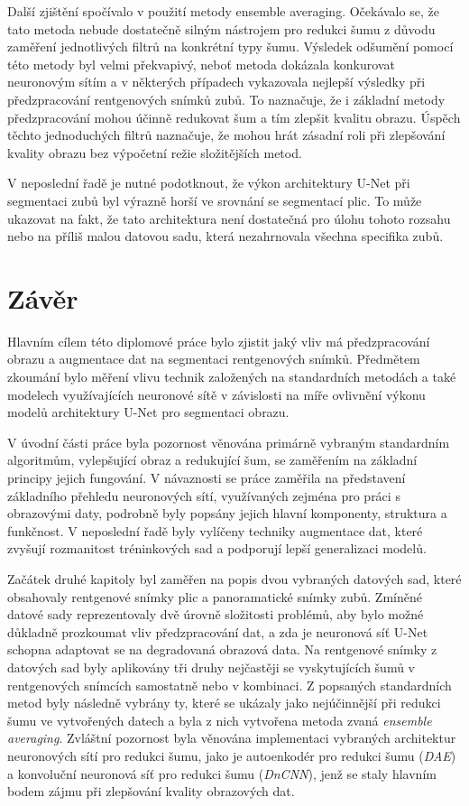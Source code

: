 \documentclass[male,czech,api_ing]{thesis}
\begin{document}
Další zjištění spočívalo v použití metody ensemble averaging. Očekávalo se, že tato metoda nebude dostatečně silným nástrojem pro redukci šumu z důvodu zaměření jednotlivých filtrů na konkrétní typy šumu. Výsledek odšumění pomocí této metody byl velmi překvapivý, neboť metoda dokázala konkurovat neuronovým sítím a v některých případech vykazovala nejlepší výsledky při předzpracování rentgenových snímků zubů. To naznačuje, že i základní metody předzpracování mohou účinně redukovat šum a tím zlepšit kvalitu obrazu. Úspěch těchto jednoduchých filtrů naznačuje, že mohou hrát zásadní roli při zlepšování kvality obrazu bez výpočetní režie složitějších metod. 

V neposlední řadě je nutné podotknout, že výkon architektury U-Net při segmentaci zubů byl výrazně horší ve srovnání se segmentací plic. To může ukazovat na fakt, že tato architektura není dostatečná pro úlohu tohoto rozsahu nebo na příliš malou datovou sadu, která nezahrnovala všechna specifika zubů.

\chapter{Závěr}
Hlavním cílem této diplomové práce bylo zjistit jaký vliv má předzpracování obrazu a augmentace dat na segmentaci rentgenových snímků. Předmětem zkoumání bylo měření vlivu technik založených na standardních metodách a také modelech využívajících neuronové sítě v závislosti na míře ovlivnění výkonu modelů architektury U-Net pro segmentaci obrazu.

V úvodní části práce byla pozornost věnována primárně vybraným standardním algoritmům, vylepšující obraz a redukující šum, se zaměřením na základní principy jejich fungování. V návaznosti se práce zaměřila na představení základního přehledu neuronových sítí, využívaných zejména pro práci s obrazovými daty, podrobně byly popsány jejich hlavní komponenty, struktura a funkčnost. V neposlední řadě byly vylíčeny techniky augmentace dat, které zvyšují rozmanitost tréninkových sad a podporují lepší generalizaci modelů.

Začátek druhé kapitoly byl zaměřen na popis dvou vybraných datových sad, které obsahovaly rentgenové snímky plic a panoramatické snímky zubů. Zmíněné datové sady reprezentovaly dvě úrovně složitosti problémů, aby bylo možné důkladně prozkoumat vliv předzpracování dat, a zda je neuronová síť U-Net schopna adaptovat se na degradovaná obrazová data. Na rentgenové snímky z datových sad byly aplikovány tři druhy nejčastěji se vyskytujících šumů v rentgenových snímcích samostatně nebo v kombinaci. Z popsaných standardních metod byly následně vybrány ty, které se ukázaly jako nejúčinnější při redukci šumu ve vytvořených datech a byla z nich vytvořena metoda zvaná \textit{ensemble averaging}. Zvláštní pozornost byla věnována implementaci vybraných architektur neuronových sítí pro redukci šumu, jako je autoenkodér pro redukci šumu (\textit{DAE}) a konvoluční neuronová síť pro redukci šumu (\textit{DnCNN}), jenž se staly hlavním bodem zájmu při zlepšování kvality obrazových dat.
\end{document}
